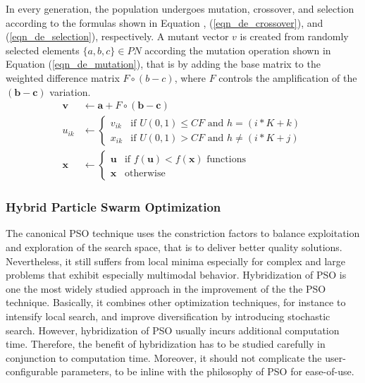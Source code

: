 In every generation, the population undergoes mutation, crossover, and selection according to the formulas shown in Equation , (\ref{eqn_de_crossover}), and (\ref{eqn_de_selection}), respectively. A mutant vector $v$ is created from randomly selected elements $\{a,b,c\}\in PN$ according the mutation operation shown in Equation (\ref{eqn_de_mutation}), that is by adding the base matrix to the weighted difference matrix $F\circ(b-c)$, where $F$ controls the amplification of the $(\textbf{b}-\textbf{c})$ variation.
\begin{align}
    \label{eqn_de_mutation}
    \textbf{v} & \leftarrow   \textbf{a} + F\circ(\textbf{b}-\textbf{c})\\
    \label{eqn_de_crossover}
    u_{ik} & \leftarrow 
    \begin{cases}
    v_{ik} & \mbox{if } U(0,1) \leq CF \mbox{ and } h = (i*K+k)\\
    x_{ik} & \mbox{if } U(0,1) > CF \mbox{ and } h \neq (i*K+j)
    \end{cases}\\
    \label{eqn_de_selection}
    \textbf{x} &\leftarrow 
    \begin{cases}
    \textbf{u} & \mbox{if } f(\textbf{u}) < f(\textbf{x})\mbox{ functions}\\
    \textbf{x} & \mbox{otherwise }
    \end{cases}
\end{align}

\subsubsection{Hybrid Particle Swarm Optimization}
The canonical PSO technique uses the constriction factors to balance exploitation and exploration of the search space, that is to deliver better quality solutions. Nevertheless, it still suffers from local minima especially for complex and large problems that exhibit especially multimodal behavior. Hybridization of PSO is one the most widely studied approach in the improvement of the the PSO technique. Basically, it combines other optimization techniques, for instance to intensify local search, and improve diversification by introducing stochastic search. However, hybridization of PSO usually incurs additional computation time. Therefore, the benefit of hybridization has to be studied carefully in conjunction to computation time. Moreover, it should not complicate the user-configurable parameters, to be inline with the philosophy of PSO for ease-of-use.

